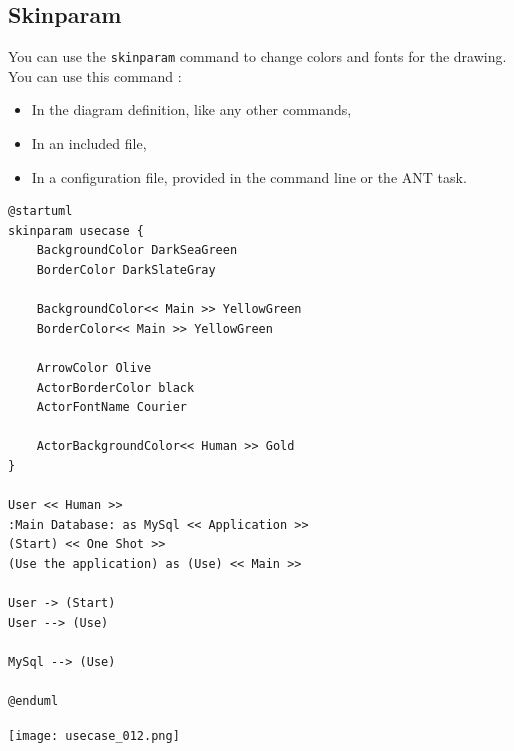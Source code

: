 \newpage \subsection{Skinparam}

You can use the \texttt{skinparam} command to change colors and fonts for the drawing.
You can use this command :

\begin{itemize}
\item In the diagram definition, like any other commands,
\item In an included file,
\item In a configuration file, provided in the command line or the ANT task.
\end{itemize}


\begin{lstlisting}
@startuml
skinparam usecase {
	BackgroundColor DarkSeaGreen
	BorderColor DarkSlateGray

	BackgroundColor<< Main >> YellowGreen
	BorderColor<< Main >> YellowGreen
	
	ArrowColor Olive
	ActorBorderColor black
	ActorFontName Courier

	ActorBackgroundColor<< Human >> Gold
}

User << Human >>
:Main Database: as MySql << Application >>
(Start) << One Shot >>
(Use the application) as (Use) << Main >>

User -> (Start)
User --> (Use)

MySql --> (Use)

@enduml
\end{lstlisting}
\begin{center}
\texttt{[image: usecase\_012.png]}
\end{center}
